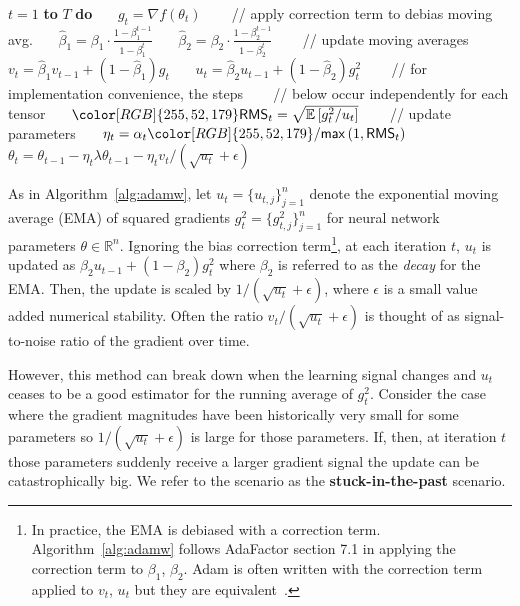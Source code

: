 \begin{algorithm}
    \caption{${\color[RGB]{255,52,179} \mathsf{Stable}}\mathsf{AdamW}\left( \{\alpha_t\}_{t=0}^T, \beta_1, \beta_2, \epsilon\right)$}
    \label{alg:adamw}
 \begin{algorithmic}
  $t = 1$ {\bfseries to} $T$ {\bfseries do}
 \STATE \ \ \ $g_t = \nabla f(\theta_t)$
 \STATE \ \ \ {\color{gray} // apply correction term to debias moving avg.}
 \STATE \ \ \ $\hat \beta_1 = \beta_1 \cdot \frac{1 - \beta_1^{t-1}}{1 - \beta_1^t}$
 \STATE \ \ \ $\hat \beta_2 = \beta_2 \cdot \frac{1 - \beta_2^{t-1}}{1 - \beta_2^t}$
 \STATE \ \ \ {\color{gray} // update moving averages}
 \STATE \ \ \ $v_t = \hat \beta_1 v_{t-1} + (1 - \hat \beta_1) g_t$
 \STATE \ \ \ $u_t = \hat \beta_2 u_{t-1} + (1 - \hat \beta_2) g_t^2$
 \STATE \ \ \ {\color{gray} // for implementation convenience, the steps}
 \STATE \ \ \ {\color{gray} // below occur independently for each tensor}
 \STATE \ \ \ ${\color[RGB]{255,52,179}\mathsf{RMS}_t = \sqrt{\mathbb{E} \left[ g_{t}^2 / u_{t} \right]}}$ 
 \STATE \ \ \ {\color{gray} // update parameters}
 \STATE \ \ \ $\eta_t = \alpha_t {\color[RGB]{255,52,179}/ \mathsf{max}\left(1, \mathsf{RMS}_t \right)}$
 \STATE \ \ \ $\theta_t = \theta_{t-1} - \eta_t \lambda \theta_{t-1} -  \eta_t  v_t /\left(\sqrt{u_t} + \epsilon \right) $
 \end{algorithmic}
 \end{algorithm}

As in Algorithm~\ref{alg:adamw}, let $u_t = \{u_{t, j}\}_{j=1}^n$ denote the exponential moving average (EMA) of squared gradients $g_t^2 = \{ g_{t, j}^2\}_{j=1}^n$ for neural network parameters $\theta \in \mathbb{R}^n$.
Ignoring the bias correction term\footnote{In practice, the EMA is debiased with a correction term. 
Algorithm~\ref{alg:adamw} follows AdaFactor section 7.1 in applying the correction term to $\beta_1$, $\beta_2$.
Adam is often written with the correction term applied to $v_t$, $u_t$ but they are equivalent~\cite{shazeer2018adafactor}. }, at each iteration $t$, $u_t$ is updated as $\beta_2 u_{t - 1} + (1 - \beta_2) g_t^2$ where $\beta_2$ is referred to as the \textit{decay} for the EMA. Then, the update is scaled by $1/\left(\sqrt{u_t} + \epsilon\right)$, where $\epsilon$ is a small value added numerical stability. Often the ratio $v_t / \left(\sqrt{u_t} + \epsilon\right)$ is thought of as signal-to-noise ratio of the gradient over time.

However, this method can break down when the learning signal changes and $u_t$ ceases to be a good estimator for the running average of $g_t^2$. Consider the case where the gradient magnitudes have been historically very small for some parameters so $1/\left(\sqrt{u_t} + \epsilon\right)$ is large for those parameters. If, then, at iteration $t$ those parameters suddenly receive a larger gradient signal the update can be catastrophically big. We refer to the scenario as the \textbf{stuck-in-the-past} scenario.

